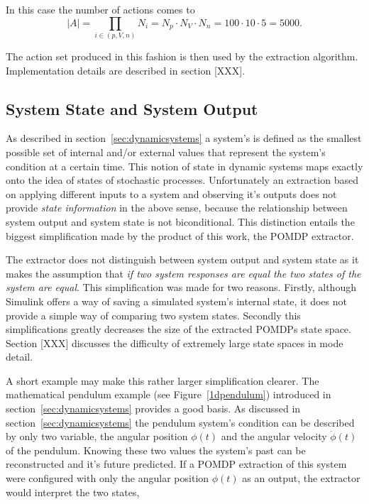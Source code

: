 In this case the number of actions comes to 
\[
|A| = \prod_{i \in (p,V,n)} N_i = N_p \cdot N_V \cdot N_n = 100 \cdot 10 \cdot 5 = 5000.
\]

The action set produced in this fashion is then used by the extraction algorithm. Implementation details are described in section [XXX].

\subsection{System State and System Output}

As described in section~\ref{sec:dynamicsystems} a system's  is defined as the smallest possible set of internal and/or external values that represent the system's condition at a certain time. This notion of state in dynamic systems maps exactly onto the idea of states of stochastic processes. Unfortunately an extraction based on applying different inputs to a system and observing it's outputs does not provide \textit{state information} in the above sense, because the relationship between system output and system state is not biconditional. This distinction entails the biggest simplification made by the product of this work, the POMDP extractor.

The extractor does not distinguish between system output and system state as it makes the assumption that \textit{if two system responses are equal the two states of the system are equal}. This simplification was made for two reasons. Firstly, although Simulink offers a way of saving a simulated system's internal state, it does not provide a simple way of comparing two system states. Secondly this simplifications greatly decreases the size of the extracted POMDPs state space. Section [XXX] discusses the difficulty of extremely large state spaces in mode detail.

A short example may make this rather larger simplification clearer. The mathematical pendulum example (see Figure~\ref{1dpendulum}) introduced in section~\ref{sec:dynamicsystems} provides a good basis. As discussed in section~\ref{sec:dynamicsystems} the pendulum system's condition can be described by only two variable, the angular position $\phi(t)$ and the angular velocity $\dot{\phi}(t)$ of the pendulum. Knowing these two values the system's past can be reconstructed and it's future predicted. If a POMDP extraction of this system were configured with only the angular position $\phi(t)$ as an output, the extractor would interpret the two states,

